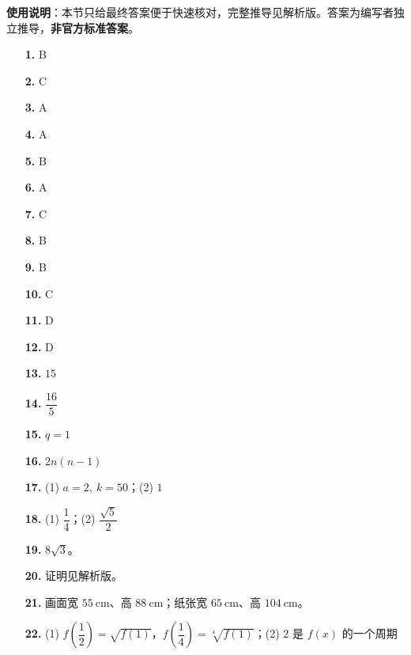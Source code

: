 
\begin{gknotice}
\textbf{使用说明}：本节只给最终答案便于快速核对，完整推导见解析版。答案为编写者独立推导，\textbf{非官方标准答案}。
\end{gknotice}

\begin{itemize}[leftmargin=2.6em]
  \item[\textbf{1.}] B
  \item[\textbf{2.}] C
  \item[\textbf{3.}] A
  \item[\textbf{4.}] A
  \item[\textbf{5.}] B
  \item[\textbf{6.}] A
  \item[\textbf{7.}] C
  \item[\textbf{8.}] B
  \item[\textbf{9.}] B
  \item[\textbf{10.}] C
  \item[\textbf{11.}] D
  \item[\textbf{12.}] D
  \item[\textbf{13.}] $15$
  \item[\textbf{14.}] $\dfrac{16}{5}$
  \item[\textbf{15.}] $q=1$
  \item[\textbf{16.}] $2n(n-1)$
  \item[\textbf{17.}] (1) $a=2,\ k=50$；(2) $1$
  \item[\textbf{18.}] (1) $\dfrac14$；(2) $\dfrac{\sqrt5}{2}$
  \item[\textbf{19.}] $8\sqrt3$。
  \item[\textbf{20.}] 证明见解析版。
  \item[\textbf{21.}] 画面宽 $55\ \mathrm{cm}$、高 $88\ \mathrm{cm}$；纸张宽 $65\ \mathrm{cm}$、高 $104\ \mathrm{cm}$。
  \item[\textbf{22.}] (1) $f\left(\dfrac12\right)=\sqrt{f(1)}$，$f\left(\dfrac14\right)=\sqrt[4]{f(1)}$；(2) $2$ 是 $f(x)$ 的一个周期
\end{itemize}
